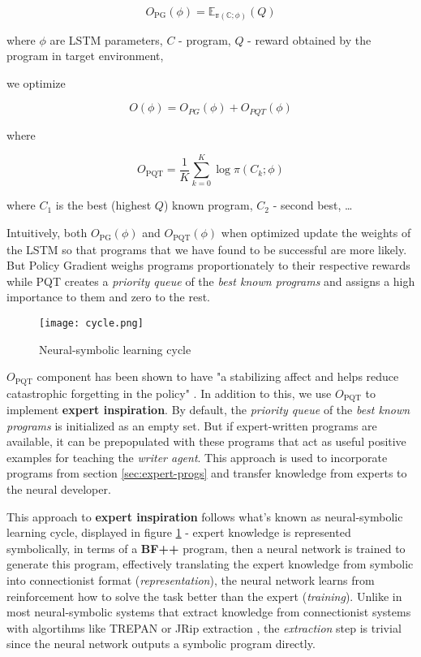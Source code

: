 \begin{equation}
    O_{\text{PG}}(\phi) = \mathbb{E_{\pi(C; \phi)}}(Q)
\end{equation}

where $\phi$ are LSTM parameters, $C$ - program, $Q$ - reward obtained by the program in target environment,

we optimize

\begin{equation}
    O(\phi)=O_{PG}(\phi)+O_{PQT}(\phi)
\end{equation}

where

\begin{equation}
    O_{\text{PQT}} = \frac{1}{K} \sum_{k=0}^K \log \pi(C_k; \phi)
\end{equation}

where $C_1$ is the best (highest $Q$) known program, $C_2$ - second best, \dots

Intuitively, both $O_{\text{PG}}(\phi)$ and $O_{\text{PQT}}(\phi)$ when optimized update the weights of the LSTM so that programs that we have found to be successful are more likely.
But Policy Gradient weighs programs proportionately to their respective rewards while PQT creates a \textit{priority queue} of the \textit{best known programs} and assigns a high importance to them and zero to the rest.

\begin{figure}
    \centering
    \texttt{[image: cycle.png]}
    \caption{Neural-symbolic learning cycle \cite{cycle}}
    \label{fig:cycle}
\end{figure}

$O_{\text{PQT}}$ component has been shown to have "a stabilizing affect and helps reduce catastrophic forgetting in the policy" \cite{abolafiaNeuralProgramSynthesis2018}.
In addition to this, we use $O_{\text{PQT}}$ to implement \textbf{expert inspiration}.
By default, the \textit{priority queue} of the \textit{best known programs} is initialized as an empty set.
But if expert-written programs are available, it can be prepopulated with these programs that act as useful positive examples for teaching the \emph{writer agent}.
This approach is used to incorporate programs from section \ref{sec:expert-progs} and transfer knowledge from experts to the neural developer.

This approach to \textbf{expert inspiration} follows what's known as neural-symbolic learning cycle, displayed in figure \ref{fig:cycle} - expert knowledge is represented symbolically, in terms of a \textbf{BF++} program, then a neural network is trained to generate this program, effectively translating the expert knowledge from symbolic into connectionist format (\emph{representation}), the neural network learns from reinforcement how to solve the task better than the expert (\emph{training}).
Unlike in most neural-symbolic systems \cite{neuralsymbolic} that extract knowledge from connectionist systems with algortihms like TREPAN \cite{trepan} or JRip extraction \cite{jripextr}, the \emph{extraction} step is trivial since the neural network outputs a symbolic program directly.

